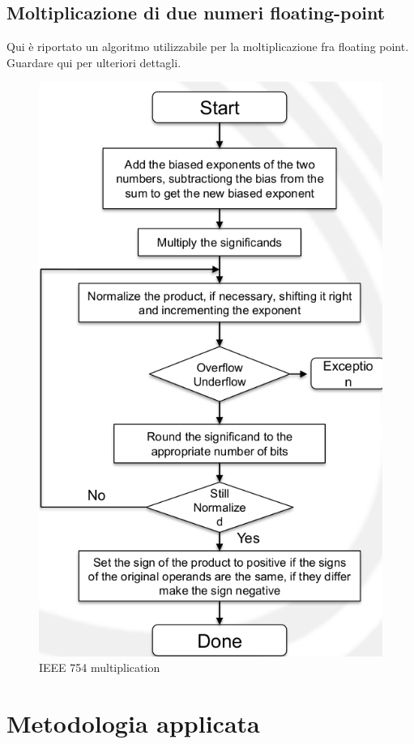 \documentclass[]{IEEEtran}
\begin{document}
\subsection{Moltiplicazione di due numeri floating-point}
Qui è riportato un algoritmo utilizzabile per la moltiplicazione fra floating point. Guardare qui per ulteriori dettagli\cite{IEEE754Mult}.
\begin{figure}[!htb]
    \centering
    \includegraphics[width=0.6\linewidth]{figures/ieee_multiplication.png}
    \caption{IEEE 754 multiplication}
    \label{fig:IEEE_multiplication}
\end{figure}



\section{Metodologia applicata}
\end{document}
